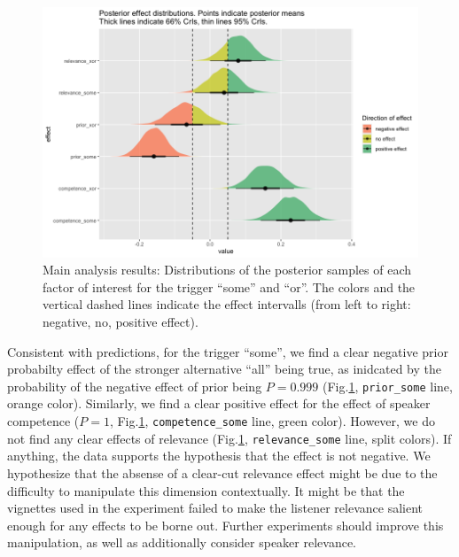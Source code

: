 \documentclass{sp}
\begin{document}
\begin{figure}[t]
	\begin{center}
		\includegraphics[width=1\linewidth]{images/posterior-effects-main.png}
	\end{center}
	\vspace{-0.3cm}
	\caption{Main analysis results: Distributions of the posterior samples of each factor of interest for the trigger ``some'' and ``or''. The colors and the vertical dashed lines indicate the effect intervalls (from left to right: negative, no, positive effect).}
	\label{posteriors-main}
\end{figure}

Consistent with predictions, for the trigger ``some'', we find a clear negative prior probabilty effect of the stronger alternative ``all'' being true, as inidcated by the probability of the negative effect of prior being $P = 0.999$ (Fig.\ref{posteriors-main}, \texttt{prior\_some} line, orange color). Similarly, we find a clear positive effect for the effect of speaker competence ($P =  1$, Fig.\ref{posteriors-main}, \texttt{competence\_some} line, green color). However, we do not find any clear effects of relevance (Fig.\ref{posteriors-main}, \texttt{relevance\_some} line, split colors). If anything, the data supports the hypothesis that the effect is not negative.  
We hypothesize that the absense of a clear-cut relevance effect might be due to the difficulty to manipulate this dimension contextually. It might be that the vignettes used in the experiment failed to make the listener relevance salient enough for any effects to be borne out. Further experiments should improve this manipulation, as well as additionally consider speaker relevance.  
\end{document}
